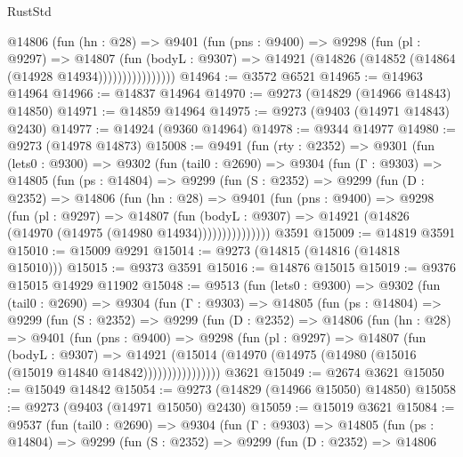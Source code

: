 \begin{lexlean}{RustStd}
\begin{coremodule}
{\begin{coremodule}
{{{{{{{{{{{{{{{{{{{{{{{{{{{{{{{{{{{{{{{{{{{{{{{{{{{{{{{                  @14806
                    (fun (hn : @28) =>
                    @9401
                      (fun (pns : @9400) =>
                      @9298
                        (fun (pl : @9297) =>
                        @14807
                          (fun (bodyL : @9307) =>
                          @14921 (@14826 (@14852 (@14864 (@14928 @14934))))))))))))))))
@14964 := @3572 @6521
@14965 := @14963 @14964
@14966 := @14837 @14964
@14970 := @9273 (@14829 (@14966 @14843) @14850)
@14971 := @14859 @14964
@14975 := @9273 (@9403 (@14971 @14843) @2430)
@14977 := @14924 (@9360 @14964)
@14978 := @9344 @14977
@14980 := @9273 (@14978 @14873)
@15008 := @9491
    (fun (rty : @2352) =>
    @9301
      (fun (lets0 : @9300) =>
      @9302
        (fun (tail0 : @2690) =>
        @9304
          (fun (Γ : @9303) =>
          @14805
            (fun (ps : @14804) =>
            @9299
              (fun (S : @2352) =>
              @9299
                (fun (D : @2352) =>
                @14806
                  (fun (hn : @28) =>
                  @9401
                    (fun (pns : @9400) =>
                    @9298
                      (fun (pl : @9297) =>
                      @14807
                        (fun (bodyL : @9307) =>
                        @14921 (@14826 (@14970 (@14975 (@14980 @14934)))))))))))))))
    @3591
@15009 := @14819 @3591
@15010 := @15009 @9291
@15014 := @9273 (@14815 (@14816 (@14818 @15010)))
@15015 := @9373 @3591
@15016 := @14876 @15015
@15019 := @9376 @15015 @14929 @11902
@15048 := @9513
    (fun (lets0 : @9300) =>
    @9302
      (fun (tail0 : @2690) =>
      @9304
        (fun (Γ : @9303) =>
        @14805
          (fun (ps : @14804) =>
          @9299
            (fun (S : @2352) =>
            @9299
              (fun (D : @2352) =>
              @14806
                (fun (hn : @28) =>
                @9401
                  (fun (pns : @9400) =>
                  @9298
                    (fun (pl : @9297) =>
                    @14807
                      (fun (bodyL : @9307) =>
                      @14921
                        (@15014
                          (@14970 (@14975 (@14980 (@15016 (@15019 @14840 @14842))))))))))))))))
    @3621
@15049 := @2674 @3621
@15050 := @15049 @14842
@15054 := @9273 (@14829 (@14966 @15050) @14850)
@15058 := @9273 (@9403 (@14971 @15050) @2430)
@15059 := @15019 @3621
@15084 := @9537
    (fun (tail0 : @2690) =>
    @9304
      (fun (Γ : @9303) =>
      @14805
        (fun (ps : @14804) =>
        @9299
          (fun (S : @2352) =>
          @9299
            (fun (D : @2352) =>
            @14806
}}}}}}}}}}}}}}}}}}}}}}}}}}}}}}}}}}}}}}}}}}}}}}}}}}}}}}}
\end{coremodule}}
\end{coremodule}
\end{lexlean}
